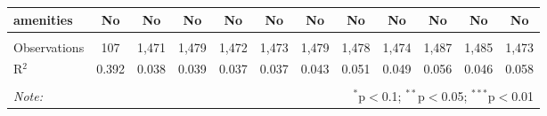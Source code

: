 \begin{table}[!htbp]
\begin{tabular}{@{\extracolsep{5pt}}lccccccccccc}
amenities & No & No & No & No & No & No & No & No & No & No & No \\ 
\hline \\[-1.8ex] 
Observations & 107 & 1,471 & 1,479 & 1,472 & 1,473 & 1,479 & 1,478 & 1,474 & 1,487 & 1,485 & 1,473 \\ 
R$^{2}$ & 0.392 & 0.038 & 0.039 & 0.037 & 0.037 & 0.043 & 0.051 & 0.049 & 0.056 & 0.046 & 0.058 \\ 
\hline 
\hline \\[-1.8ex] 
\textit{Note:}  & \multicolumn{11}{r}{$^{*}$p$<$0.1; $^{**}$p$<$0.05; $^{***}$p$<$0.01} \\ 
\end{tabular} 
\end{table} 
